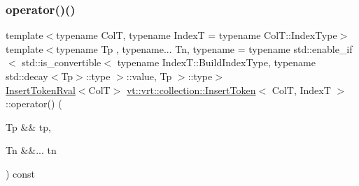\mbox{\label{structvt_1_1vrt_1_1collection_1_1_insert_token_ae7065dd97dded33cbd5f11b20c1d309a}} 
\subsubsection{\texorpdfstring{operator()()}{operator()()}\hspace{0.1cm}{\footnotesize\ttfamily [1/2]}}
{\footnotesize\ttfamily template$<$typename ColT, typename IndexT = typename Col\+T\+::\+Index\+Type$>$ \\
template$<$typename Tp , typename... Tn, typename  = typename std\+::enable\+\_\+if$<$      std\+::is\+\_\+convertible$<$        typename Index\+T\+::\+Build\+Index\+Type, typename std\+::decay$<$\+Tp$>$\+::type      $>$\+::value, Tp    $>$\+::type$>$ \\
\hyperlink{structvt_1_1vrt_1_1collection_1_1_insert_token_rval}{Insert\+Token\+Rval}$<$ColT$>$ \hyperlink{structvt_1_1vrt_1_1collection_1_1_insert_token}{vt\+::vrt\+::collection\+::\+Insert\+Token}$<$ ColT, IndexT $>$\+::operator() (\begin{DoxyParamCaption}\item[{Tp \&\&}]{tp,  }\item[{Tn \&\&...}]{tn }\end{DoxyParamCaption}) const\hspace{0.3cm}{\ttfamily [inline]}}

\mbox{\label{structvt_1_1vrt_1_1collection_1_1_insert_token_a3f68c2bd0aecfe50588f8cfc14ecfa4f}} 
